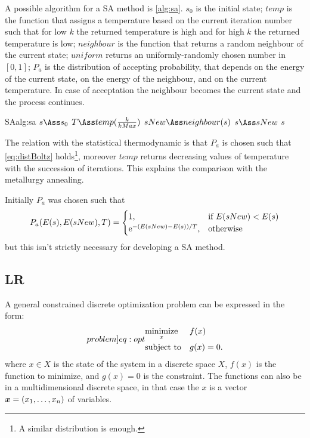 \documentclass[dissertation.tex]{subfiles}
\begin{document}
A possible algorithm for a \ac{SA} method is \cref{alg:sa}. $s_0$ is
the initial state; $temp$ is the function that assigns a
temperature based on the current iteration number such that for low
$k$ the returned temperature is high and for high $k$ the returned temperature
is low; $neighbour$ is the function that returns a random neighbour of
the current state; $uniform$ returns an uniformly-randomly chosen
number in $[0,1]$; $P_a$ is the distribution of accepting probability,
that depends on the energy of the current state, on the energy of the
neighbour, and on the current temperature. In case of acceptation the
neighbour becomes the current state and the process continues.

\begin{algo}{\acf{SA}}{alg:sa}
  \State $s\Ass s_0$
  \State $T\Ass temp(\frac{k}{kMax})$
  \State $sNew\Ass neighbour(s)$
  \State $s\Ass sNew$
  \EndIf
  \EndFor
  \State\Return $s$
  \EndFunction
\end{algo}
The relation with the statistical thermodynamic is that $P_a$ is chosen
such that
\cref{eq:distBoltz} holds\footnote{A similar distribution is enough.},
moreover $temp$ returns decreasing values of
temperature with the succession of iterations. This explains the
comparison with the metallurgy annealing.

Initially $P_a$ was chosen such that
\begin{equation*}
  P_a(E(s), E(sNew), T)=
  \begin{cases}
    1,& \text{if }E(sNew)<E(s)\\
    \mathrm{e}^{-(E(sNew)-E(s))/T},& \text{otherwise}
  \end{cases}
\end{equation*}
but this isn't strictly necessary for developing a \ac{SA} method.

\subsection{\acf{LR}}\label{sec:lagrangianRelaxation}
A general constrained discrete optimization problem can be expressed in
the form:
\begin{equation}\label[problem]{eq:opt}
\begin{aligned}
& \underset{x}{\text{minimize}}
& & f(x) \\
& \text{subject to}
& & g(x)=0.
\end{aligned}
\end{equation}
where $x\in X$ is the state of the system in a discrete space $X$, $f(x)$
is the function to
minimize, and $g(x)=0$ is the constraint. The functions can also be
in a multidimensional discrete space, in that case the $x$ is a vector
$\boldsymbol{x}=(x_1,\dots,x_n)$ of variables.
\end{document}
